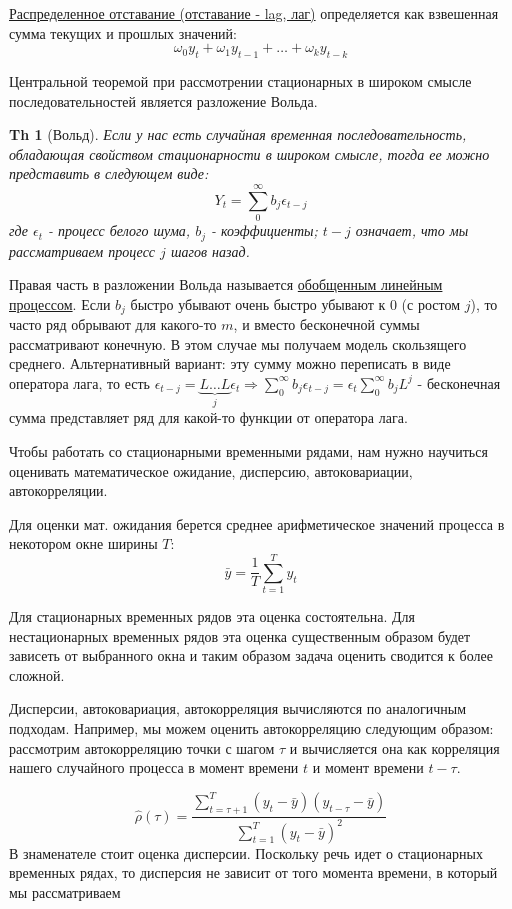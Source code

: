 \documentclass{article}
\newtheorem*{theorem}{Th}
\begin{document}
\underline{Распределенное отставание (отставание - lag, лаг)} определяется как взвешенная сумма текущих и прошлых значений:  $$\omega_0 y_t + \omega_1 y_{t-1} + \dots + \omega_k y_{t-k}$$

Центральной теоремой при рассмотрении стационарных в широком смысле последовательностей является разложение Вольда.


\begin{theorem} [Вольд] \label{t1} 
Если у нас есть случайная временная последовательность, обладающая свойством стационарности в широком смысле, тогда ее можно представить в следующем виде: $$Y_t = \sum_{0}^{\infty} b_j \epsilon_{t-j}$$ где $\epsilon_t$ - процесс белого шума, $b_j$ - коэффициенты; $t-j$ означает, что мы рассматриваем процесс $j$ шагов назад. 
\end{theorem}

Правая часть в разложении Вольда называется \underline{обобщенным линейным процессом}. Если $b_j$ быстро убывают очень быстро убывают к 0 (с ростом $j$), то часто ряд обрывают для какого-то $m$, и вместо бесконечной суммы рассматривают конечную. В этом случае мы получаем модель скользящего среднего. Альтернативный вариант: эту сумму можно переписать в виде оператора лага, то есть $\epsilon_{t-j} = \underbrace{L \dots L}_{j } \epsilon_t \Rightarrow \sum_{0}^{\infty} b_j \epsilon_{t-j} = \epsilon_t \sum_{0}^{\infty} b_j L^j$ - бесконечная сумма представляет ряд для какой-то функции от оператора лага.

Чтобы работать со стационарными временными рядами, нам нужно научиться оценивать математическое ожидание, дисперсию, автоковариации, автокорреляции.

Для оценки мат. ожидания берется среднее арифметическое значений процесса в некотором окне ширины $T:$
$$\bar{y} = \frac{1}{T} \sum^T_{t=1} y_t$$

Для стационарных временных рядов эта оценка состоятельна. Для нестационарных временных рядов эта оценка существенным образом будет зависеть от выбранного окна и таким образом задача оценить сводится к более сложной. 

Дисперсии,  автоковариация, автокорреляция вычисляются по аналогичным подходам. Например, мы можем оценить автокорреляцию следующим образом: рассмотрим автокорреляцию точки с шагом $\tau$  и вычисляется она как корреляция нашего случайного процесса в момент времени $t$ и момент времени $t - \tau$. 

$$\hat{\rho}(\tau) = \frac{\sum ^T_{t=\tau+1} (y_t-\bar y)(y_{t-\tau} - \bar y) }{\sum ^T_{t=1} (y_t-\bar y)^2}$$
В знаменателе стоит оценка дисперсии. Поскольку речь идет о стационарных временных рядах, то дисперсия не зависит от того момента времени, в который мы рассматриваем 
\end{document}
